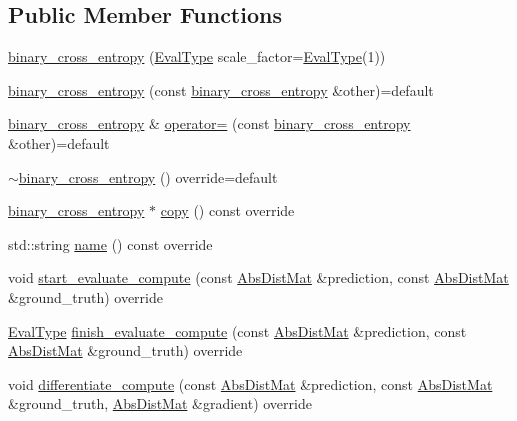 \subsection*{Public Member Functions}
\begin{DoxyCompactItemize}
\item 
\hyperlink{classlbann_1_1binary__cross__entropy_ad142f09272d2572c34812dc6bbc54434}{binary\+\_\+cross\+\_\+entropy} (\hyperlink{base_8hpp_a3266f5ac18504bbadea983c109566867}{Eval\+Type} scale\+\_\+factor=\hyperlink{base_8hpp_a3266f5ac18504bbadea983c109566867}{Eval\+Type}(1))
\item 
\hyperlink{classlbann_1_1binary__cross__entropy_a2afe78604e320beef2af10bcdb95a02a}{binary\+\_\+cross\+\_\+entropy} (const \hyperlink{classlbann_1_1binary__cross__entropy}{binary\+\_\+cross\+\_\+entropy} \&other)=default
\item 
\hyperlink{classlbann_1_1binary__cross__entropy}{binary\+\_\+cross\+\_\+entropy} \& \hyperlink{classlbann_1_1binary__cross__entropy_aff599d9d615b2c7ffa66b0dbc9555c0f}{operator=} (const \hyperlink{classlbann_1_1binary__cross__entropy}{binary\+\_\+cross\+\_\+entropy} \&other)=default
\item 
\hyperlink{classlbann_1_1binary__cross__entropy_a2d3758e81b02ffdd2f57e8aae621169c}{$\sim$binary\+\_\+cross\+\_\+entropy} () override=default
\item 
\hyperlink{classlbann_1_1binary__cross__entropy}{binary\+\_\+cross\+\_\+entropy} $\ast$ \hyperlink{classlbann_1_1binary__cross__entropy_a5183da69553c71cb3fffc765e95c623f}{copy} () const override
\item 
std\+::string \hyperlink{classlbann_1_1binary__cross__entropy_a6a068d51808a54a2a6dd913650f60569}{name} () const override
\item 
void \hyperlink{classlbann_1_1binary__cross__entropy_a4acaf96a18b00b38adae375a69740071}{start\+\_\+evaluate\+\_\+compute} (const \hyperlink{base_8hpp_a9a697a504ae84010e7439ffec862b470}{Abs\+Dist\+Mat} \&prediction, const \hyperlink{base_8hpp_a9a697a504ae84010e7439ffec862b470}{Abs\+Dist\+Mat} \&ground\+\_\+truth) override
\item 
\hyperlink{base_8hpp_a3266f5ac18504bbadea983c109566867}{Eval\+Type} \hyperlink{classlbann_1_1binary__cross__entropy_acedb440a94926866c4de4fdeeb5165bd}{finish\+\_\+evaluate\+\_\+compute} (const \hyperlink{base_8hpp_a9a697a504ae84010e7439ffec862b470}{Abs\+Dist\+Mat} \&prediction, const \hyperlink{base_8hpp_a9a697a504ae84010e7439ffec862b470}{Abs\+Dist\+Mat} \&ground\+\_\+truth) override
\item 
void \hyperlink{classlbann_1_1binary__cross__entropy_aeb1d10100a565e1c92a4f75fb7f58829}{differentiate\+\_\+compute} (const \hyperlink{base_8hpp_a9a697a504ae84010e7439ffec862b470}{Abs\+Dist\+Mat} \&prediction, const \hyperlink{base_8hpp_a9a697a504ae84010e7439ffec862b470}{Abs\+Dist\+Mat} \&ground\+\_\+truth, \hyperlink{base_8hpp_a9a697a504ae84010e7439ffec862b470}{Abs\+Dist\+Mat} \&gradient) override
\end{DoxyCompactItemize}
